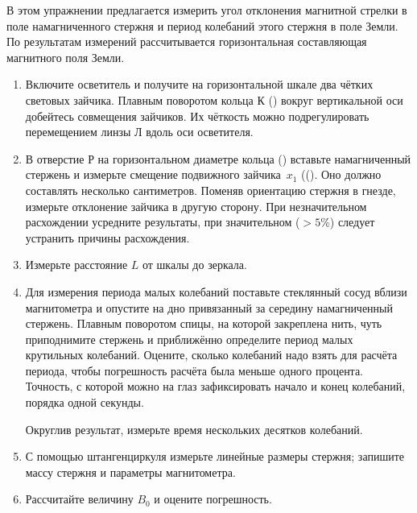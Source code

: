 \begin{lab:task}

    В этом упражнении предлагается измерить угол отклонения магнитной стрелки в поле намагниченного стержня и период
    колебаний этого стержня в поле Земли. По результатам измерений рассчитывается горизонтальная составляющая магнитного
    поля Земли.

    \begin{enumerate}
        \item Включите осветитель и получите на горизонтальной шкале два чётких световых зайчика. Плавным поворотом кольца К ()
        вокруг вертикальной оси добейтесь совмещения зайчиков. Их чёткость можно подрегулировать перемещением линзы Л вдоль оси
        осветителя.

        \item В отверстие Р на горизонтальном диаметре кольца () вставьте намагниченный стержень и измерьте смещение подвижного
        зайчика~$x_1$ ((). Оно должно составлять несколько сантиметров. Поменяв ориентацию стержня в гнезде, измерьте
        отклонение зайчика в другую сторону. При незначительном расхождении усредните результаты, при значительном ($>5$\%)
        следует устранить причины расхождения.

        \item Измерьте расстояние $L$ от шкалы до зеркала.

        \item Для измерения периода малых колебаний поставьте стеклянный сосуд вблизи магнитометра и опустите на дно привязанный за
        середину намагниченный стержень. Плавным поворотом спицы, на которой закреплена нить, чуть приподнимите стержень и
        приближённо определите период малых крутильных колебаний. Оцените, сколько колебаний надо взять для расчёта периода,
        чтобы погрешность расчёта была меньше одного процента. Точность, с которой можно на глаз зафиксировать начало и конец
        колебаний, порядка одной секунды.

        Округлив результат, измерьте время нескольких десятков колебаний.

        \item С помощью штангенциркуля измерьте линейные размеры стержня; запишите массу стержня и параметры магнитометра.

        \item Рассчитайте величину $B_0$ и оцените погрешность.
    \end{enumerate}
\end{lab:task}



